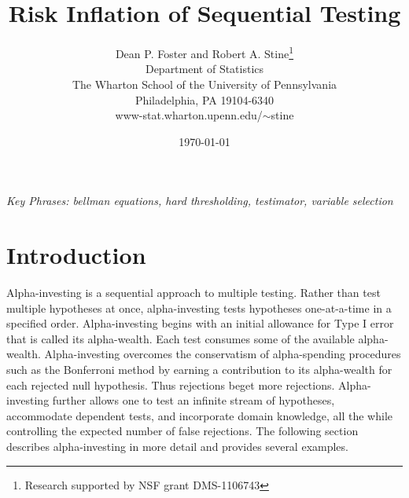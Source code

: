 \documentclass[12pt]{article}
\title{ Risk Inflation of Sequential Testing }
\author{
        Dean P. Foster and Robert A. Stine\thanks{Research supported by NSF grant DMS-1106743 }  \\
        Department of Statistics            \\
        The Wharton School of the University of Pennsylvania \\
        Philadelphia, PA 19104-6340                          \\
        www-stat.wharton.upenn.edu/$\sim$stine 
}
\date{\today}
\begin{document}
\maketitle 


\vspace{0.05in}

\noindent
{\it Key Phrases: bellman equations, hard thresholding, testimator, variable selection}

\clearpage


\section{ Introduction }

 Alpha-investing is a sequential approach to multiple testing.  Rather than test
 multiple hypotheses at once, alpha-investing tests hypotheses one-at-a-time in
 a specified order.  Alpha-investing begins with an initial allowance for Type I
 error that is called its alpha-wealth.  Each test consumes some of the
 available alpha-wealth.  Alpha-investing overcomes the conservatism of
 alpha-spending procedures such as the Bonferroni method by earning a
 contribution to its alpha-wealth for each rejected null hypothesis.  Thus
 rejections beget more rejections.  Alpha-investing further allows one to test
 an infinite stream of hypotheses, accommodate dependent tests, and incorporate
 domain knowledge, all the while controlling the expected number of false
 rejections. The following section describes alpha-investing in more detail and
 provides several examples.
\end{document}
